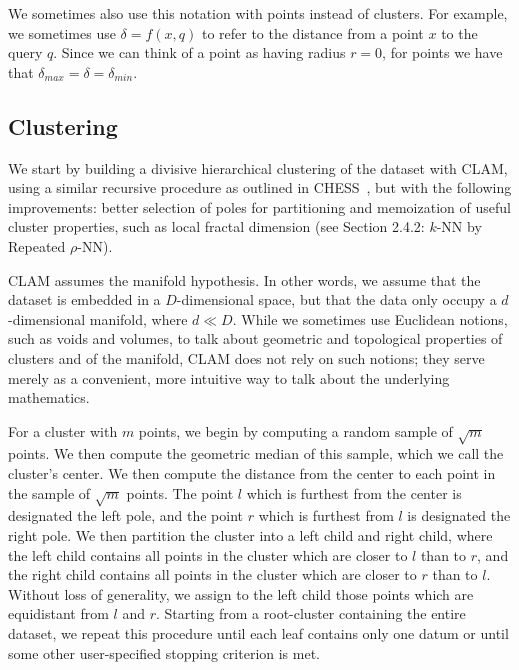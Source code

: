 We sometimes also use this notation with points instead of clusters. For example, we sometimes use $\delta = f(x, q)$ to refer to the distance 
from a point $x$ to the query $q$. Since we can think of a point as having radius $r=0$, for points we have that $\delta_{max} = \delta = \delta_{min}$.


\subsection{Clustering}
\label{subsec:methods:clustering}

We start by building a divisive hierarchical clustering of the dataset with CLAM, using a 
similar recursive procedure as outlined in CHESS~\cite{ishaq2019clustered}, but with the following 
improvements: better selection of poles for partitioning and memoization of useful cluster properties, 
such as local fractal dimension (see Section 2.4.2: $k$-NN by Repeated $\rho$-NN). 


CLAM assumes the manifold hypothesis. 
In other words, we assume that the dataset is embedded in a $D$-dimensional space, but that the data only occupy 
a $d$-dimensional manifold, where $d \ll D$. 
While we sometimes use Euclidean notions, such as voids and volumes, to talk about geometric and topological 
properties of clusters and of the manifold, CLAM does not rely on such notions; 
they serve merely as a convenient, more intuitive way to talk about the underlying mathematics.


For a cluster with $m$ points, we begin by computing a 
random sample of $\sqrt m$ points. We then compute the geometric median of this sample, which we call the 
cluster's center. We then compute the distance from the center to each point in the sample of $\sqrt m$ points. 
The point $l$ which is furthest from the center is designated the left pole, and the point $r$ which is furthest
from $l$ is designated the right pole. We then partition the cluster into a left child and right child, where the 
left child contains all points in the cluster which are closer to $l$ than to $r$, and the right child contains all 
points in the cluster which are closer to $r$ than to $l$. Without loss of generality, we assign to the left child 
those points which are equidistant from $l$ and $r$. Starting from a root-cluster containing the entire dataset, we 
repeat this procedure until each leaf contains only one datum or until some other user-specified stopping criterion 
is met.


